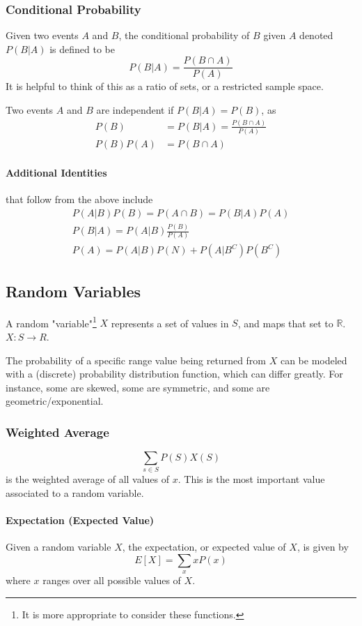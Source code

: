 \documentclass{article}
\begin{document}
\subsubsection{Conditional Probability}\label{cond-prob}
Given two events $A$ and $B$, the conditional probability of $B$ given $A$ denoted $P(B|A)$ is defined to be 
$$P(B|A)=\frac{P(B \cap A)}{P(A)}$$
It is helpful to think of this as a ratio of sets, or a restricted sample space.

Two events $A$ and $B$ are independent if $P(B|A)=P(B)$, as
\begin{align*}
    P(B) &= P(B|A) = \frac{P(B \cap A)}{P(A)}\\
    P(B)P(A) &= P(B \cap A)
\end{align*}

\paragraph{Additional Identities} that follow from the above include
\begin{align*}
    P(A|B)P(B) = P(A \cap B) = P(B|A)P(A)\\
    P(B|A) = P(A|B)\frac{P(B)}{P(A)}\\
    P(A) = P(A|B)P(N)+P(A|B^C)P(B^C)
\end{align*}

\subsection{Random Variables}
A random "variable"\footnote{It is more appropriate to consider these functions.} $X$ represents a set of values in $S$, and maps that set to $\mathbb{R}$.  $X: S \to R$.

The probability of a specific range value being returned from $X$ can be modeled with a (discrete) probability distribution function, which can differ greatly.
For instance, some are skewed, some are symmetric, and some are geometric/exponential.

\subsubsection{Weighted Average} \label{expected}
$$\sum_{s \in S} P(S)X(S)$$ is the weighted average of all values of $x$. This is the most important value associated to a random variable.

\paragraph{Expectation (Expected Value)} Given a random variable $X$, the expectation, or expected value of $X$, is given by
$$E\left[X\right]=\sum_x xP(x)$$ where $x$ ranges over all possible values of $X$.
\end{document}
